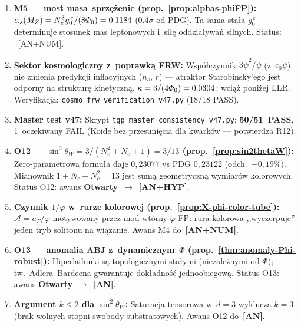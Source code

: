 \begin{remark}
\begin{enumerate}[nosep]
  \item \textbf{M5 --- most masa--sprz\k{e}\.zenie
    (prop.~\ref{prop:alphas-phiFP}):}
    $\alpha_s(M_Z) = N_c^3 g_0^{\,e}/(8\varPhi_0) = 0.1184$
    ($0.4\sigma$ od PDG). Ta sama sta\l{}a $g_0^{\,e}$
    determinuje stosunek mas leptonowych i~si\l{}\k{e}
    oddzia\l{}ywa\'n silnych. Status: ~[AN+NUM].

  \item \textbf{Sektor kosmologiczny z~poprawk\k{a} FRW:}
    Wsp\'o\l{}czynnik $3\dot\psi^2/\psi$ (z~$c_0\psi$) nie zmienia
    predykcji inflacyjnych ($n_s$, $r$) --- atraktor
    Starobinsky'ego jest odporny na struktur\k{e} kinetyczn\k{a}.
    $\kappa = 3/(4\varPhi_0) = 0.0304$: wci\k{a}\.z poni\.zej LLR.
    Weryfikacja: \texttt{cosmo\_frw\_verification\_v47.py} (18/18 PASS).

  \item \textbf{Master test v47:}
    Skrypt \texttt{tgp\_master\_consistency\_v47.py}:
    \textbf{50/51~PASS}, 1~oczekiwany FAIL
    (Koide bez przesuni\k{e}cia dla kwark\'ow --- potwierdza R12).

  \item \textbf{O12 --- $\sin^2\theta_W = 3/(N_c^2{+}N_c{+}1) = 3/13$
    (prop.~\ref{prop:sin2thetaW}):}
    Zero-parametrowa formu\l{}a daje $0{,}23077$ vs PDG $0{,}23122$
    (odch.\ $-0{,}19\%$). Mianownik $1 + N_c + N_c^2 = 13$
    jest sum\k{a} geometryczn\k{a} wymiar\'ow kolorowych.
    Status O12: awans \textbf{Otwarty}~$\to$~\textbf{[AN+HYP]}.

  \item \textbf{Czynnik $1/\varphi$ w~rurze kolorowej
    (prop.~\ref{prop:X-phi-color-tube}):}
    $\mathcal{A} = a_\Gamma/\varphi$ motywowany przez mod
    wt\'orny $\varphi$-FP: rura kolorowa ,,wyczerpuje'' jeden
    tryb solitonu na wi\k{a}zanie. Awans M4 do~\textbf{[AN+NUM]}.

  \item \textbf{O13 --- anomalia ABJ z~dynamicznym~$\Phi$
    (prop.~\ref{thm:anomaly-Phi-robust}):}
    Hiperladunki s\k{a} topologicznymi sta\l{}ymi
    (niezale\.znymi od $\Phi$); tw.~Adlera--Bardeena
    gwarantuje dok\l{}adno\'s\'c jednoobiegow\k{a}.
    Status O13: awans \textbf{Otwarty}~$\to$~\textbf{[AN]}.

  \item \textbf{Argument $k \le 2$ dla $\sin^2\theta_W$:}
    Saturacja tensorowa w~$d = 3$ wyklucza $k{=}3$
    (brak wolnych stopni swobody substratowych).
    Awans O12 do~\textbf{[AN]}.


\end{enumerate}
\end{remark}
